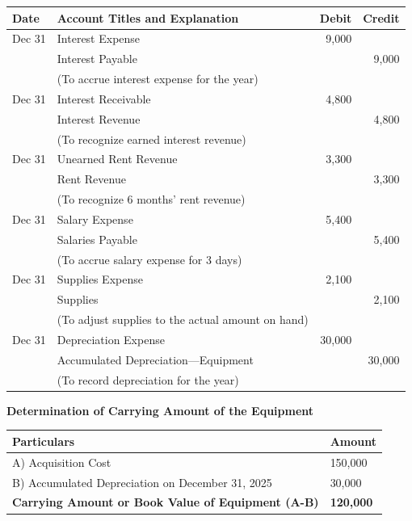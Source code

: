 \documentclass[12pt,a4paper]{book}
\begin{document}
\begin{center}
\begin{tabular}{|l|l|r|r|}
\hline
\textbf{Date} & \textbf{Account Titles and Explanation} & \textbf{Debit} & \textbf{Credit} \\
\hline
Dec 31 & Interest Expense & 9,000 & \\
       & Interest Payable & & 9,000 \\
       & (To accrue interest expense for the year) & & \\
\hline
Dec 31 & Interest Receivable & 4,800 & \\
       & Interest Revenue & & 4,800 \\
       & (To recognize earned interest revenue) & & \\
\hline
Dec 31 & Unearned Rent Revenue & 3,300 & \\
       & Rent Revenue & & 3,300 \\
       & (To recognize 6 months' rent revenue) & & \\
\hline
Dec 31 & Salary Expense & 5,400 & \\
       & Salaries Payable & & 5,400 \\
       & (To accrue salary expense for 3 days) & & \\
\hline
Dec 31 & Supplies Expense & 2,100 & \\
       & Supplies & & 2,100 \\
       & (To adjust supplies to the actual amount on hand) & & \\
\hline
Dec 31 & Depreciation Expense & 30,000 & \\
       & Accumulated Depreciation—Equipment & & 30,000 \\
       & (To record depreciation for the year) & & \\
\hline
\end{tabular}
\end{center}


\vspace{0.5cm}

\textbf{Determination of Carrying Amount of the Equipment}

\begin{center}
\begin{tabular}{|p{12cm}|p{3cm}|}
\hline
\textbf{Particulars} & \textbf{Amount} \\
\hline
A) Acquisition Cost & 150,000 \\
B) Accumulated Depreciation on December 31, 2025 & 30,000 \\
\hline
\textbf{Carrying Amount or Book Value of Equipment (A-B)} & \textbf{120,000} \\
\hline
\end{tabular}
\end{center}
\end{document}
